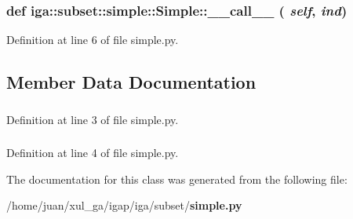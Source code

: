 \subsubsection{\setlength{\rightskip}{0pt plus 5cm}def iga::subset::simple::Simple::\_\-\_\-call\_\-\_\- ( {\em self},  {\em ind})}\label{classiga_1_1subset_1_1simple_1_1Simple_e49623a1dd490c102b08cefebed5af12}




Definition at line 6 of file simple.py.

\subsection{Member Data Documentation}
\subsubsection{}\label{classiga_1_1subset_1_1simple_1_1Simple_87c9716d5b4cc17d644f59200ecb7d20}




Definition at line 3 of file simple.py.
\subsubsection{}\label{classiga_1_1subset_1_1simple_1_1Simple_90ff05379902de0c2df7b51f45c3af70}




Definition at line 4 of file simple.py.

The documentation for this class was generated from the following file:\begin{CompactItemize}
\item 
/home/juan/xul\_\-ga/igap/iga/subset/{\bf simple.py}\end{CompactItemize}

